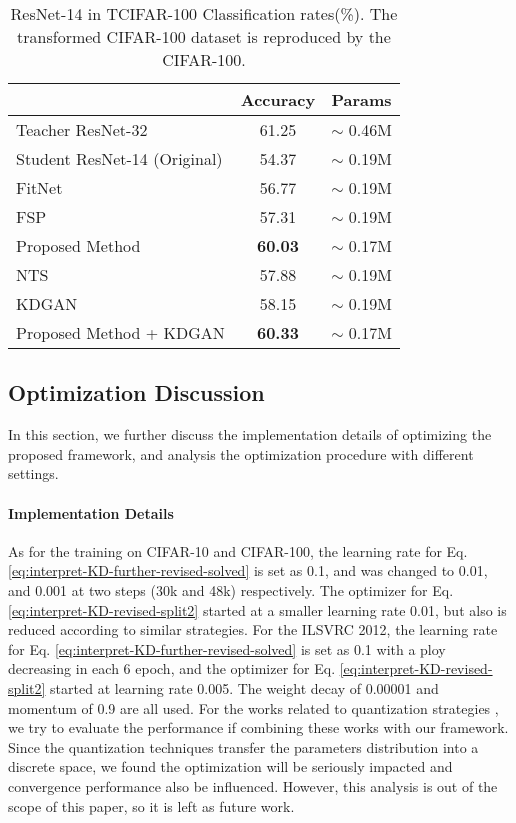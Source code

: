\documentclass[10pt,twocolumn,letterpaper]{article}
\begin{document}
\begin{table}[ht]
\begin{center}
\begin{tabular}{l|c|c}
\hline
 & Accuracy & Params\\
\hline
Teacher ResNet-32 & 61.25 & $\sim$ 0.46M\\
Student ResNet-14 (Original) & 54.37 & $\sim$ 0.19M\\
FitNet \cite{Romero2014FitNets} & 56.77 & $\sim$ 0.19M\\
FSP \cite{yim2017gift} & 57.31 & $\sim$ 0.19M\\
Proposed Method & \textbf{60.03} & $\sim$ 0.17M\\
NTS \cite{huang2017like} & 57.88 & $\sim$ 0.19M\\
KDGAN \cite{wang2018kdgan} & 58.15 & $\sim$ 0.19M\\
Proposed Method + KDGAN \cite{wang2018kdgan}  & \textbf{60.33} & $\sim$ 0.17M\\
\hline
\end{tabular}
\end{center}
\caption{ResNet-14 in TCIFAR-100 Classification rates(\%). The transformed CIFAR-100 dataset is reproduced by the CIFAR-100.}
\label{tab:tcifar100}
\end{table}

\subsection{Optimization Discussion}\label{sec_optimization_analysis}
In this section,
we further discuss the implementation details of optimizing the proposed framework,
and analysis the optimization procedure with different settings.

\paragraph{Implementation Details}
As for the training on CIFAR-10 and CIFAR-100,
the learning rate for Eq. \ref{eq:interpret-KD-further-revised-solved} is set as 0.1,
and was changed to 0.01, and 0.001 at two steps (30k and 48k) respectively.
The optimizer for Eq. \ref{eq:interpret-KD-revised-split2}
started at a smaller learning rate 0.01,
but also is reduced according to similar strategies.
For the ILSVRC 2012,
the learning rate for Eq. \ref{eq:interpret-KD-further-revised-solved} is set as 0.1
with a ploy decreasing in each 6 epoch,
and the optimizer for Eq. \ref{eq:interpret-KD-revised-split2}
started at learning rate 0.005.
The weight decay of 0.00001 and momentum of 0.9 are all used.
For the works related to quantization strategies \cite{jacob2018quantization, rastegari2016xnor},
we try to evaluate the performance if combining these works with our framework.
Since the quantization techniques transfer the parameters distribution into a discrete space,
we found the optimization will be seriously impacted
and convergence performance also be influenced.
However,
this analysis is out of the scope of this paper,
so it is left as future work.
\end{document}
